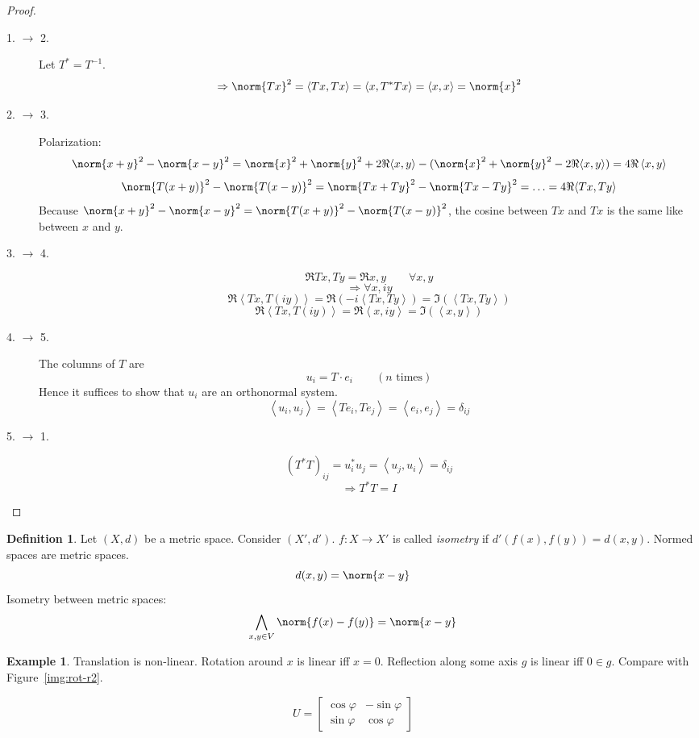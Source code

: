 \documentclass[a4paper,landscape,twocolumn]{article}
\newcommand\functional[1]{\left\langle{#1}\right\rangle}
\theoremstyle{definition}
\newtheorem{defi}{Definition}
\newtheorem{ex}{Example}
\DeclarePairedDelimiter\norm\lVert\rVert
\begin{document}
\begin{proof}
  \begin{description}
    \item[1. $\to$ 2.]
      Let $T^* = T^{-1}$.
      \[ \Rightarrow \norm{Tx}^2 = \functional{Tx, Tx} = \functional{x, T^* Tx} = \functional{x, x} = \norm{x}^2 \]
    \item[2. $\to$ 3.]
      Polarization:
      \[
        \norm{x + y}^2 - \norm{x - y}^2 = \norm{x}^2 + \norm{y}^2 + 2\Re{\functional{x,y}} - (\norm{x}^2 + \norm{y}^2 - 2\Re{\functional{x,y}}) = 4\Re\functional{x,y}
      \] \[
        \norm{T(x + y)}^2 - \norm{T(x-y)}^2 = \norm{Tx + Ty}^2 - \norm{Tx - Ty}^2 = \ldots = 4\Re{\functional{Tx, Ty}}
      \]
      Because $\norm{x + y}^2 - \norm{x - y}^2 = \norm{T(x + y)}^2 - \norm{T(x-y)}^2$,
      the cosine between $Tx$ and $Tx$ is the same like between $x$ and $y$.
    \item[3. $\to$ 4.]
      \[ \Re{Tx, Ty} = \Re{x,y} \qquad \forall x,y \]
      \[ \Rightarrow \forall x, iy \]
      \[ \Re{\functional{Tx, T(iy)}} = \Re{(-i\functional{Tx,Ty})} = \Im(\functional{Tx, Ty}) \]
      \[ \Re{\functional{Tx, T(iy)}} = \Re{\functional{x, iy}} = \Im(\functional{x, y}) \]
    \item[4. $\to$ 5.]
      The columns of $T$ are
      \[ u_i = T \cdot e_i \qquad (n \text{ times}) \]
      Hence it suffices to show that $u_i$ are an orthonormal system.
      \[ \functional{u_i, u_j} = \functional{T e_i, T e_j} = \functional{e_i, e_j} = \delta_{ij} \]
    \item[5. $\to$ 1.]
      \[ (T^* T)_{ij} = u_i^* u_j = \functional{u_j, u_i} = \delta_{ij} \]
      \[ \Rightarrow T^* T = I \]
  \end{description}
\end{proof}

\begin{defi}
  \label{defi-8.71}
  Let $(X, d)$ be a metric space.
  Consider $(X', d')$.
  $f: X \to X'$ is called \emph{isometry} if $d'(f(x), f(y)) = d(x, y)$.
  Normed spaces are metric spaces.
  \[ d(x,y) = \norm{x - y} \]
  Isometry between metric spaces:
  \[ \bigwedge_{x,y \in V} \norm{f(x) - f(y)} = \norm{x - y} \]
\end{defi}

\begin{ex}
  \label{bsp-8.72}
  Translation is non-linear.
  Rotation around $x$ is linear iff $x = 0$.
  Reflection along some axis $g$ is linear iff $0 \in g$.
  Compare with Figure~\ref{img:rot-r2}.

  \[ U = \begin{bmatrix} \cos{\varphi} & -\sin{\varphi} \\ \sin{\varphi} & \cos{\varphi} \end{bmatrix} \]
\end{ex}
\end{document}
